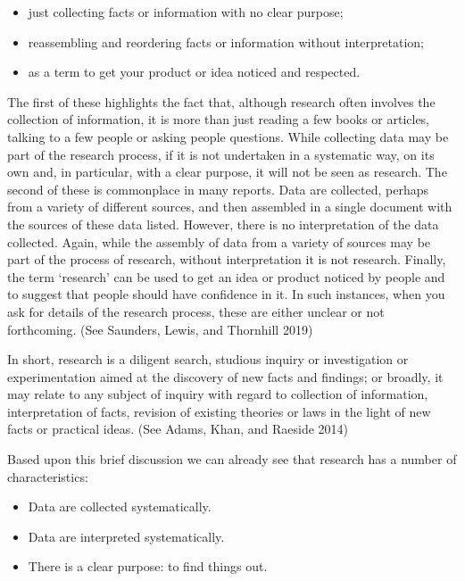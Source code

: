 \documentclass[
  letterpaper,
  DIV=11,
  numbers=noendperiod]{scrreprt}
\providecommand{\tightlist}{%
  \setlength{\itemsep}{0pt}\setlength{\parskip}{0pt}}\usepackage{longtable,booktabs,array}
\begin{document}
\begin{itemize}
\tightlist
\item
  just collecting facts or information with no clear purpose;
\item
  reassembling and reordering facts or information without
  interpretation;
\item
  as a term to get your product or idea noticed and respected.
\end{itemize}

The first of these highlights the fact that, although research often
involves the collection of information, it is more than just reading a
few books or articles, talking to a few people or asking people
questions. While collecting data may be part of the research process, if
it is not undertaken in a systematic way, on its own and, in particular,
with a clear purpose, it will not be seen as research. The second of
these is commonplace in many reports. Data are collected, perhaps from a
variety of different sources, and then assembled in a single document
with the sources of these data listed. However, there is no
interpretation of the data collected. Again, while the assembly of data
from a variety of sources may be part of the process of research,
without interpretation it is not research. Finally, the term `research'
can be used to get an idea or product noticed by people and to suggest
that people should have confidence in it. In such instances, when you
ask for details of the research process, these are either unclear or not
forthcoming. (See Saunders, Lewis, and Thornhill 2019)

In short, research is a diligent search, studious inquiry or
investigation or experimentation aimed at the discovery of new facts and
findings; or broadly, it may relate to any subject of inquiry with
regard to collection of information, interpretation of facts, revision
of existing theories or laws in the light of new facts or practical
ideas. (See Adams, Khan, and Raeside 2014)

Based upon this brief discussion we can already see that research has a
number of characteristics:

\begin{itemize}
\tightlist
\item
  Data are collected systematically.
\item
  Data are interpreted systematically.
\item
  There is a clear purpose: to find things out.
\end{itemize}
\end{document}
